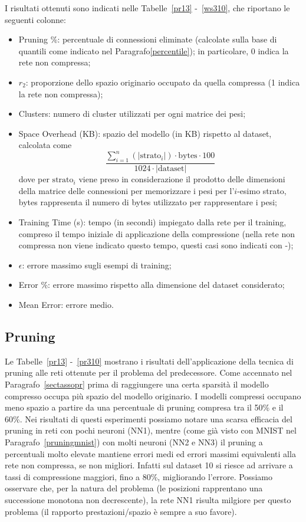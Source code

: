 \documentclass[11pt,a4paper,twoside,
openright]{book}
\begin{document}
I risultati ottenuti sono indicati nelle Tabelle~\ref{pr13} -~\ref{ws310}, che riportano le seguenti colonne:
\begin{itemize}
\item Pruning \%: percentuale di connessioni eliminate (calcolate sulla base di quantili come indicato nel Paragrafo\ref{percentile}); in particolare, 0 indica la rete non compressa;
\item $r_2$: proporzione dello spazio originario occupato da quella compressa (1 indica la rete non compressa);
\item Clusters: numero di cluster utilizzati per ogni matrice dei pesi;
\item Space Overhead (KB):  spazio del modello (in KB) rispetto al dataset, calcolata come $$\displaystyle{\frac{\sum\limits_{i=1}^n \left(|\mathrm{strato}_i|\right) \cdot \mathrm{bytes} \cdot 100}{1024 \cdot \left| \mathrm{dataset} \right|}}$$ dove per $\mathrm{strato}_i$ viene preso in considerazione il prodotto delle dimensioni della matrice delle connessioni per memorizzare i pesi per l'$i$-esimo strato, bytes rappresenta il numero di bytes utilizzato per rappresentare i pesi;
\item Training Time (s): tempo (in secondi) impiegato dalla rete per il training, compreso il tempo iniziale di applicazione della compressione (nella rete non compressa non viene indicato questo tempo, questi casi sono indicati con -);
\item $\epsilon$: errore massimo sugli esempi di training;
\item Error \%: errore massimo rispetto alla dimensione del dataset considerato;
\item Mean Error: errore medio.
\end{itemize}

\subsection{Pruning}
\label{prpred}
Le Tabelle~\ref{pr13} -~\ref{pr310} mostrano i risultati dell'applicazione della tecnica di pruning alle reti ottenute per il problema del predecessore. Come accennato nel Paragrafo~\ref{sectassopr} prima di raggiungere una certa sparsità il modello compresso occupa più spazio del modello originario. I modelli compressi occupano meno spazio a partire da una percentuale di pruning compresa tra il 50\% e il 60\%.
Nei risultati di questi esperimenti possiamo notare una scarsa efficacia del pruning in reti con pochi neuroni (NN1), mentre (come già visto con MNIST nel Paragrafo~\ref{pruningmnist}) con molti neuroni (NN2 e NN3) il pruning a percentuali molto elevate mantiene errori medi ed errori massimi equivalenti alla rete non compressa, se non migliori. 
Infatti sul dataset 10 si riesce ad arrivare a tassi di compressione maggiori, fino a 80\%, migliorando l'errore. Possiamo osservare che, per la natura del problema (le posizioni rapprentano una successione monotona non decrescente), la rete NN1 risulta milgiore per questo problema (il rapporto prestazioni/spazio è sempre a suo favore).

\end{document}
